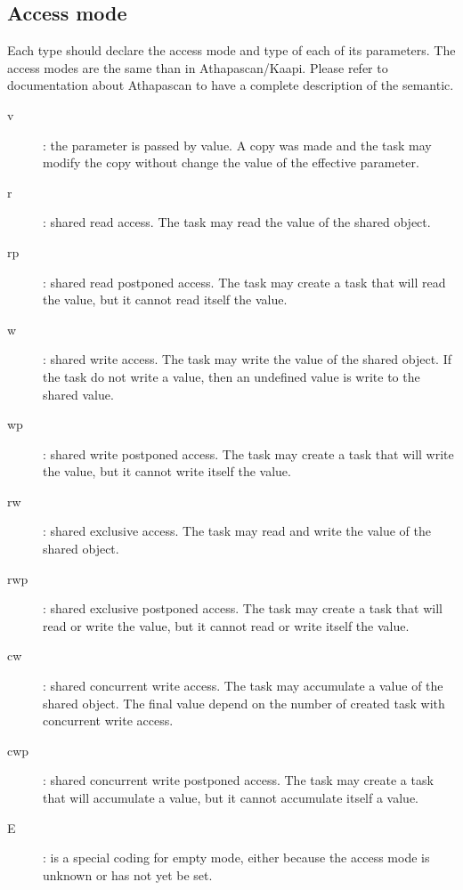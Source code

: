 \documentclass{report}
\begin{document}
\subsection{Access mode}

Each type should declare the access mode and type of each of its parameters. The access modes are the same than in Athapascan/Kaapi. Please refer to documentation about Athapascan to have a complete description of the semantic.
\begin{description}
\item [v]: the parameter is passed by value. A copy was made and the task may modify the copy without change the value of the effective parameter.
\item [r]: shared read access. The task may read the value of the shared object.
\item [rp]: shared read postponed access. The task may create a task that will read the value, but it cannot read itself the value.
\item [w]: shared write access. The task may write the value of the shared object. If the task do not write a value, then an undefined value is write to the shared value.
\item [wp]: shared write postponed access. The task may create a task that will write the value, but it cannot write itself the value.
\item [rw]: shared exclusive access. The task may read and write the value of the shared object.
\item [rwp]: shared exclusive postponed access. The task may create a task that will read or write the value, but it cannot read or write itself the value.
\item [cw]: shared concurrent write access. The task may accumulate a value of the shared object. The final value depend on the number of created task with concurrent write access.
\item [cwp]: shared concurrent write postponed access. The task may create a task that will accumulate a value, but it cannot accumulate itself a value.
\item [E]: is a special coding for empty mode, either because the access mode is unknown or has not yet be set.
\end{description}
\end{document}
